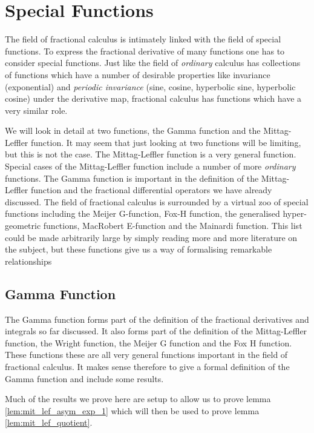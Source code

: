 
\section{Special Functions}

The field of fractional calculus is intimately linked with the field of special functions. To express the fractional derivative
of many functions one has to consider special functions. Just like the field of \emph{ordinary} calculus has collections of functions which have a number of desirable properties like invariance (exponential) and \emph{periodic invariance} (sine, cosine, hyperbolic sine, hyperbolic cosine) under the derivative map, fractional calculus has functions which have a very similar role.

We will look in detail at two functions, the Gamma function and the Mittag-Leffler function. It may seem that just looking at two functions will be limiting, but this is not the case. The Mittag-Leffler function is a very general function. Special cases of the Mittag-Leffler function include a number of more \emph{ordinary} functions. The Gamma function is important in the definition of the Mittag-Leffler function and the fractional differential operators we have already discussed. The field of fractional calculus is surrounded by a virtual zoo of special functions including the Meijer G-function, Fox-H function, the generalised hyper-geometric functions, MacRobert E-function and the Mainardi function. This list could be made arbitrarily large by simply reading more and more literature on the subject, but these functions give us a way of formalising remarkable relationships \cite{Gorenflo2014,Podlubny1999,Srivastava2001, Samko1993,Fox1961}

\subsection{Gamma Function}

The Gamma function forms part of the definition of the fractional derivatives and integrals so far discussed. It also forms part of the definition of the Mittag-Leffler function, the Wright function, the Meijer G function and the Fox H function. These functions these are all very general functions important in the field of fractional calculus. It makes sense therefore to give a formal definition of the Gamma function and include some results.

Much of the results we prove here are setup to allow us to prove lemma \ref{lem:mit_lef_asym_exp_1} which will then be used to prove lemma \ref{lem:mit_lef_quotient}. 

